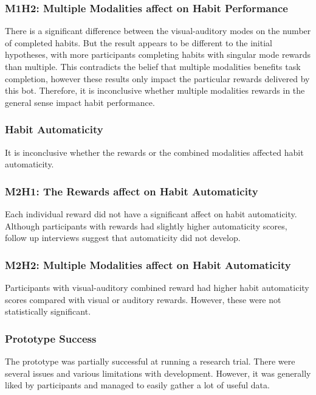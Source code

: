 \subsubsection*{M1H2: Multiple Modalities affect on Habit Performance}
There is a significant difference between the visual-auditory modes on the number of completed habits. But the result appears to be different to the initial hypotheses, with more participants completing habits with singular mode rewards than multiple. This contradicts the belief that multiple modalities benefits task completion, however these results only impact the particular rewards delivered by this bot. Therefore, it is inconclusive whether multiple modalities rewards in the general sense impact habit performance.


\subsubsection{Habit Automaticity}
It is inconclusive whether the rewards or the combined modalities affected habit automaticity.

\subsubsection*{M2H1: The Rewards affect on Habit Automaticity}
Each individual reward did not have a significant affect on habit automaticity. Although participants with rewards had slightly higher automaticity scores, follow up interviews suggest that automaticity did not develop.

\subsubsection*{M2H2: Multiple Modalities affect on Habit Automaticity}
Participants with visual-auditory combined reward had higher habit automaticity scores compared with visual or auditory rewards. However, these were not statistically significant.


\subsubsection{Prototype Success}
The prototype was partially successful at running a research trial. There were several issues and various limitations with development. However, it was generally liked by participants and managed to easily gather a lot of useful data.


